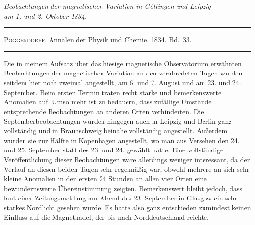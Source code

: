 \begin{center}\itshape
Beobachtungen der magnetischen Variation in Göttingen und Leipzig\\
am 1. und 2. Oktober 1834.
\end{center}
\begin{center}
\hrule\vspace{2mm}
\textsc{Poggendorff}. Annalen der Physik und Chemie. 1834. Bd.\ 33.
\vspace{2mm}\hrule\vspace{5mm}
\end{center}
Die in meinem Aufsatz über das hiesige magnetische Observatorium erwähnten Beobachtungen der magnetischen Variation an den verabredeten Tagen wurden seitdem hier noch zweimal angestellt, am 6. und 7. August und am 23. und 24. September. Beim ersten Termin traten recht starke und bemerkenswerte Anomalien auf. Umso mehr ist zu bedauern, dass zufällige Umstände entsprechende Beobachtungen an anderen Orten verhinderten. Die Septemberbeobachtungen wurden hingegen auch
in Leipzig und Berlin ganz vollständig und in Braunschweig beinahe vollständig angestellt. Außerdem wurden sie zur Hälfte in Kopenhagen angestellt, wo man aus Versehen den 24. und 25. September statt des 23. und 24. gewählt hatte. Eine vollständige Veröffentlichung dieser Beobachtungen wäre allerdings weniger interessant, da der Verlauf an diesen beiden Tagen sehr regelmäßig war, obwohl mehrere an sich sehr kleine Anomalien in den ersten 24 Stunden an allen vier Orten eine bewundernswerte Übereinstimmung zeigten. Bemerkenswert bleibt jedoch, dass laut einer Zeitungsmeldung am Abend des 23. September in Glasgow ein sehr starkes Nordlicht gesehen wurde. Es hatte also ganz entschieden zumindest keinen Einfluss auf die Magnetnadel, der bis nach Norddeutschland reichte.

